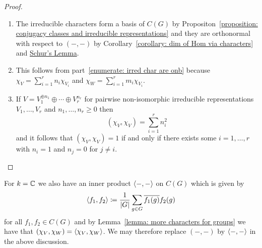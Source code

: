 \begin{proof}
  \leavevmode
  \begin{enumerate}
    \item
      The irreducible characters form a basis of $C(G)$ by Propositon~\ref{proposition: conjugacy classes and irreducible representations} and they are orthonormal with respect to $(-,-)$ by Corollary~\ref{corollary: dim of Hom via characters} and \hyperref[proposition: Schurs lemma representations]{Schur’s Lemma}.
    \item
      This follows from part~\ref*{enumerate: irred char are onb} because $\chi_V = \sum_{i=1}^r n_i \chi_{V_i}$ and $\chi_W = \sum_{i=1}^r m_i \chi_{V_i}$.
    \item 
      If $V = V_1^{\oplus n_1} \oplus \dotsb \oplus V_r^{n_r}$ for pairwise non-isomorphic irreducible representations $V_1, \dotsc, V_r$ and $n_1, \dotsc, n_r \geq 0$ then
      \[
          ( \chi_V, \chi_V )
        = \sum_{i=1}^r n_i^2
      \]
      and it follows that $(\chi_V, \chi_V) = 1$ if and only if there exists some $i = 1, \dotsc, r$ with $n_i = 1$ and $n_j = 0$ for $j \neq i$.
    \qedhere
  \end{enumerate}
\end{proof}




\begin{fluff}
  For $k = \mathbb{C}$ we also have an inner product $\langle -,- \rangle$ on $C(G)$ which is given by
  \[
              \langle f_1, f_2 \rangle
    \coloneqq  \frac{1}{|G|} \sum_{g \in G} \overline{f_1(g)} f_2(g)
  \]
  for all $f_1, f_2 \in C(G)$ and by Lemma~\ref{lemma: more characters for groups} we have that $(\chi_V, \chi_W) = \langle \chi_V, \chi_W \rangle$.
   We may therefore replace $(-,-)$ by $\langle -,- \rangle$ in the above discussion.
\end{fluff}




